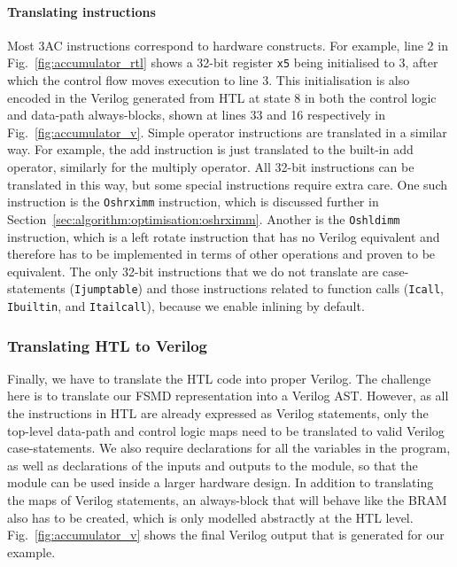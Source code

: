 \paragraph{Translating instructions}

Most 3AC instructions correspond to hardware constructs.
For example, line 2 in Fig.~\ref{fig:accumulator_rtl} shows a 32-bit register \texttt{x5} being initialised to 3, after which the control flow moves execution to line 3. This initialisation is also encoded in the Verilog generated from HTL at state 8 in both the control logic and data-path always-blocks, shown at lines 33 and 16 respectively in Fig.~\ref{fig:accumulator_v}.  Simple operator instructions are translated in a similar way.  For example, the add instruction is just translated to the built-in add operator, similarly for the multiply operator.  All 32-bit instructions can be translated in this way, but some special instructions require extra care. One such instruction is the \texttt{Oshrximm} instruction, which is discussed further in Section~\ref{sec:algorithm:optimisation:oshrximm}. Another is the \texttt{Oshldimm} instruction, which is a left rotate instruction that has no Verilog equivalent and therefore has to be implemented in terms of other operations and proven to be equivalent.
The only 32-bit instructions that we do not translate are case-statements (\texttt{Ijumptable}) and those instructions related to function calls (\texttt{Icall}, \texttt{Ibuiltin}, and \texttt{Itailcall}), because we enable inlining by default.

\subsubsection{Translating HTL to Verilog}

Finally, we have to translate the HTL code into proper Verilog. %
The challenge here is to translate our FSMD representation into a Verilog AST.  However, as all the instructions in HTL are already expressed as Verilog statements, only the top-level data-path and control logic maps need to be translated to valid Verilog case-statements.  We also require declarations for all the variables in the program, as well as declarations of the inputs and outputs to the module, so that the module can be used inside a larger hardware design.  In addition to translating the maps of Verilog statements, an always-block that will behave like the \gls{BRAM} also has to be created, which is only modelled abstractly at the HTL level.
Fig.~\ref{fig:accumulator_v} shows the final Verilog output that is generated for our example.

